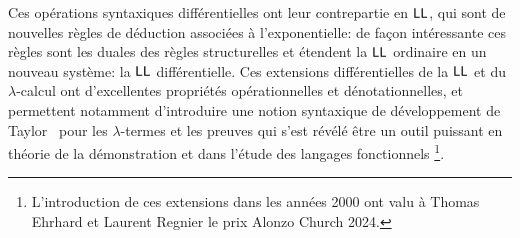 \documentclass[a4]{article}
\begin{document}
Ces opérations syntaxiques différentielles ont leur contrepartie en
$\hbox{\textsf{LL}}$, qui sont de nouvelles règles de déduction associées à
l'exponentielle: de façon intéressante ces règles sont les duales des
règles structurelles et étendent la $\hbox{\textsf{LL}}$ ordinaire en un nouveau
système: la $\hbox{\textsf{LL}}$ différentielle.
%
Ces extensions différentielles de la $\hbox{\textsf{LL}}$ et du $\lambda$-calcul ont
d'excellentes propriétés opérationnelles et dénotationnelles, et
permettent notamment d'introduire une notion syntaxique de
développement de Taylor~\cite{EhrhardRegnier06a} pour les $\lambda$-termes et
les preuves qui s'est révélé être un outil puissant en théorie de la
démonstration et dans l'étude des langages fonctionnels%
\footnote{L'introduction de ces extensions dans les années 2000 ont
  valu à Thomas Ehrhard et Laurent Regnier le prix Alonzo Church
  2024.}.



\end{document}
